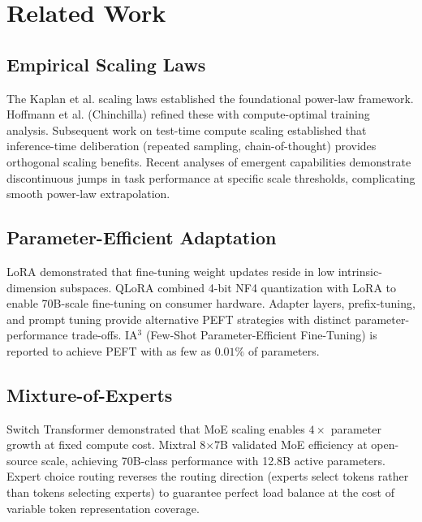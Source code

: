 \documentclass[10pt,journal,compsoc,twocolumn]{IEEEtran}
\begin{document}
\section{Related Work}



\subsection{Empirical Scaling Laws}


The Kaplan et al. scaling laws \cite{arxiv_2005_14165} established the foundational power-law framework. Hoffmann et al. (Chinchilla) refined these with compute-optimal training analysis. Subsequent work on test-time compute scaling \cite{arxiv_2203_11171} established that inference-time deliberation (repeated sampling, chain-of-thought) provides orthogonal scaling benefits. Recent analyses of emergent capabilities \cite{arxiv_2501_02497} demonstrate discontinuous jumps in task performance at specific scale thresholds, complicating smooth power-law extrapolation.


\subsection{Parameter-Efficient Adaptation}


LoRA \cite{crossref_10_48550_arxiv_2106_09685} demonstrated that fine-tuning weight updates reside in low intrinsic-dimension subspaces. QLoRA \cite{crossref_10_48550_arxiv_2305_14314} combined 4-bit NF4 quantization with LoRA to enable 70B-scale fine-tuning on consumer hardware. Adapter layers, prefix-tuning, and prompt tuning provide alternative PEFT strategies with distinct parameter-performance trade-offs. IA$^3$ (Few-Shot Parameter-Efficient Fine-Tuning) is reported to achieve PEFT with as few as $0.01\%$ of parameters.


\subsection{Mixture-of-Experts}


Switch Transformer demonstrated that MoE scaling enables $4\times$ parameter growth at fixed compute cost. Mixtral 8$\times$7B validated MoE efficiency at open-source scale, achieving 70B-class performance with 12.8B active parameters. Expert choice routing reverses the routing direction (experts select tokens rather than tokens selecting experts) to guarantee perfect load balance at the cost of variable token representation coverage.
\end{document}
